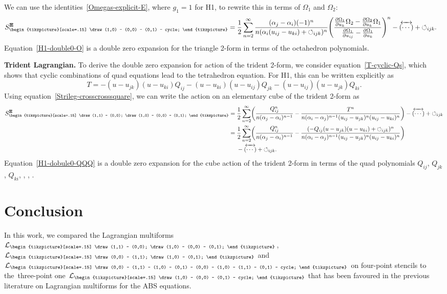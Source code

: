 \documentclass[10pt,a4paper]{amsart}
\newcommand{\inversion}[1]{\!\overleftrightarrow{\,#1\,}\!}
\newcommand{\reverse}{{\,\overleftrightarrow{\!(\cdots)\!}\,}}
\newcommand{\crosssquare}{{\begin{tikzpicture}[scale=.15]
			\draw (0,0) -- (1,1) -- (1,0) -- (0,1) -- (0,0) -- (1,0) -- (1,1) -- (0,1) -- cycle;
\end{tikzpicture}}}
\newcommand{\cross}{{\begin{tikzpicture}[scale=.15]
			\draw (0,0) -- (1,1);
			\draw (1,0) -- (0,1);
\end{tikzpicture}}}
\newcommand{\triang}{{\begin{tikzpicture}[scale=.15]
			\draw (1,0) -- (0,0) -- (0,1) -- cycle;
\end{tikzpicture}}}
\newcommand{\trileg}{{\begin{tikzpicture}[scale=.15]
			\draw (1,1) -- (0,0);
			\draw (1,0) -- (0,0) -- (0,1);
\end{tikzpicture}}}
\newcommand{\cyclic}{{\circlearrowleft}_{ijk}}
\newcommand{\pdv}[2]{\frac{\partial {#1}}{\partial {#2}}}
\newcommand{\cL}{\mathcal{L}}
\renewcommand{\vec}{\boldsymbol}
\numberwithin{equation}{section}
\begin{document}
We can use the identities~\eqref{Omegas-explicit-E}, where $g_1 = 1$ for H1, to rewrite this in terms of $\Omega_1$ and $\Omega_2$:
\begin{align}
 S_\triang^{\vec \Xi} & = \frac{1}{2}\sum_{n=2}^\infty \frac{(\alpha_j - \alpha_i)(-1)^n}{n (\alpha_i (u_{ij} - u_{ki}) + \cyclic)^n} \Biggl( \frac{\pdv{\Omega_1}{u_k} \Omega_2 - \pdv{\Omega_2}{u_k} \Omega_1}{\pdv{\Omega_1}{u_{ij}} - \pdv{\Omega_1}{u_k}} \Biggr)^n - \reverse + \cyclic .
 \label{H1-double0-O}
\end{align}
Equation~\eqref{H1-double0-O} is a double zero expansion for the triangle 2-form in terms of the octahedron polynomials.

{\bf Trident Lagrangian.}
To derive the double zero expansion for action of the trident 2-form, we consider equation~\eqref{T-cyclic-Qs}, which shows that cyclic combinations of quad equations lead to the tetrahedron equation. For H1, this can be written explicitly as
\begin{equation*}
T = - (u - u_{jk}) (u - u_{ki}) Q_{ij} - (u - u_{ki}) (u - u_{ij}) Q_{jk} - (u - u_{ij}) (u - u_{jk}) Q_{ki} .
\end{equation*}
Using equation~\eqref{Strileg-crosscrosssquare}, we can write the action on an elementary cube of the trident 2-form as
\begin{align}
S_\trileg^{\vec \Xi}
 ={}& \frac{1}{2}\sum_{n=2}^\infty \biggl(\frac{Q_{ij}^n}{n (\alpha_j - \alpha_i)^{n-1}} - \frac{T^n}{n (\alpha_i - \alpha_j)^{n-1} (u_{ij} - u_{jk})^n (u_{ij} - u_{ki})^n} \biggr) - \reverse + \cyclic \nonumber \notag\\
 ={}& \frac{1}{2}\sum_{n=2}^\infty \biggl(\frac{Q_{ij}^n}{n (\alpha_j - \alpha_i)^{n-1}} - \frac{(- Q_{ij} ( u - u_{jk} ) ( u - u_{ki} ) + \cyclic)^n}{n (\alpha_i - \alpha_j)^{n-1} (u_{ij} - u_{jk})^n (u_{ij} - u_{ki})^n} \biggr) \nonumber\\
 & - \reverse + \cyclic .\!
 \label{H1-dobule0-QQQ}
\end{align}
Equation~\eqref{H1-dobule0-QQQ} is a double zero expansion for the cube action of the trident 2-form in terms of the quad polynomials $Q_{ij}$, $Q_{jk}$, $Q_{ki}$, \smash{$\inversion Q_{ij}$}, \smash{$\inversion Q_{jk}$}, \smash{$\inversion Q_{ki}$}.


\section{Conclusion}

In this work, we compared the Lagrangian multiforms $\cL_\trileg$, $\cL_\cross$ and $\cL_\crosssquare$ on four-point stencils to the~three-point one $\cL_\triang$ that has been favoured in the previous literature on Lagrangian multiforms for the ABS equations.
\end{document}

